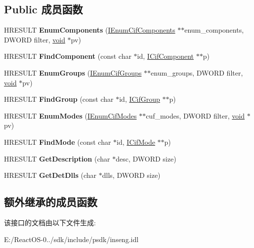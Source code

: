 \subsection*{Public 成员函数}
\begin{DoxyCompactItemize}
\item 
\mbox{\label{interface_i_cif_file_a2c65be1a151bd0bcb8b0da4d92e8eaf6}} 
H\+R\+E\+S\+U\+LT {\bfseries Enum\+Components} (\hyperlink{interface_i_enum_cif_components}{I\+Enum\+Cif\+Components} $\ast$$\ast$enum\+\_\+components, D\+W\+O\+RD filter, \hyperlink{interfacevoid}{void} $\ast$pv)
\item 
\mbox{\label{interface_i_cif_file_a7725de5941171772d4fe62523b46d7d5}} 
H\+R\+E\+S\+U\+LT {\bfseries Find\+Component} (const char $\ast$id, \hyperlink{interface_i_cif_component}{I\+Cif\+Component} $\ast$$\ast$p)
\item 
\mbox{\label{interface_i_cif_file_a7a9d031014d1650ce22b335ce3762017}} 
H\+R\+E\+S\+U\+LT {\bfseries Enum\+Groups} (\hyperlink{interface_i_enum_cif_groups}{I\+Enum\+Cif\+Groups} $\ast$$\ast$enum\+\_\+groups, D\+W\+O\+RD filter, \hyperlink{interfacevoid}{void} $\ast$pv)
\item 
\mbox{\label{interface_i_cif_file_a53188c1265c1777064376e52af2ad3a1}} 
H\+R\+E\+S\+U\+LT {\bfseries Find\+Group} (const char $\ast$id, \hyperlink{interface_i_cif_group}{I\+Cif\+Group} $\ast$$\ast$p)
\item 
\mbox{\label{interface_i_cif_file_a4cc324546e83efbb4aab31cfa9bfc363}} 
H\+R\+E\+S\+U\+LT {\bfseries Enum\+Modes} (\hyperlink{interface_i_enum_cif_modes}{I\+Enum\+Cif\+Modes} $\ast$$\ast$cuf\+\_\+modes, D\+W\+O\+RD filter, \hyperlink{interfacevoid}{void} $\ast$pv)
\item 
\mbox{\label{interface_i_cif_file_aef179704a202851df0df98ced6ec792b}} 
H\+R\+E\+S\+U\+LT {\bfseries Find\+Mode} (const char $\ast$id, \hyperlink{interface_i_cif_mode}{I\+Cif\+Mode} $\ast$$\ast$p)
\item 
\mbox{\label{interface_i_cif_file_a7c730edbe1043a6dbea3bb94be213284}} 
H\+R\+E\+S\+U\+LT {\bfseries Get\+Description} (char $\ast$desc, D\+W\+O\+RD size)
\item 
\mbox{\label{interface_i_cif_file_a299f96600bf8be15bf365b1635482a63}} 
H\+R\+E\+S\+U\+LT {\bfseries Get\+Det\+Dlls} (char $\ast$dlls, D\+W\+O\+RD size)
\end{DoxyCompactItemize}
\subsection*{额外继承的成员函数}


该接口的文档由以下文件生成\+:\begin{DoxyCompactItemize}
\item 
E\+:/\+React\+O\+S-\/0../sdk/include/psdk/inseng.\+idl\end{DoxyCompactItemize}

